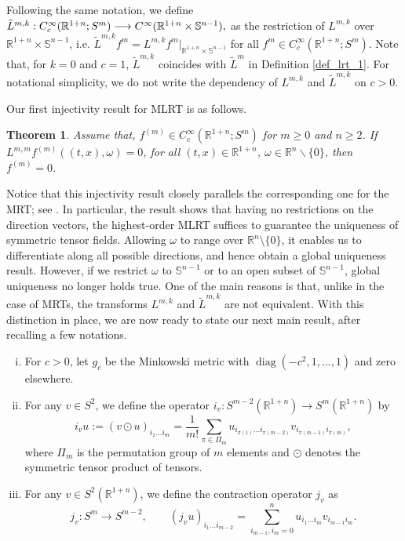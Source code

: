 \documentclass[11pt,a4paper,reqno]{amsart}
\newtheorem{theorem}{Theorem}
\DeclareMathOperator{\diag}{diag}
\newcommand{\Rn}{\mathbb{R}^n}
\newcommand{\R}{\mathbb{R}}
\newcommand{\om}{\omega}
\newcommand{\sn}{\mathbb{S}^{n-1}}
\newcommand{\Rno}{\mathbb{R}^{1+n}}
\begin{document}
Following the same notation, we define $\Tilde{L}^{m,k}: C_{c}^{\infty}(\mathbb{R}^{1+n};S^m) \longrightarrow C^{\infty}(\mathbb{R}^{1+n}\times\sn),$ as the restriction of $L^{m,k}$ over $\R^{1+n} \times \sn$, i.e. 
	 $\tilde{L}^{m,k}f^m= L^{m,k} f^{m}|_{\Rno\times \sn}$ for all $f^m \in   C_{c}^{\infty}(\mathbb{R}^{1+n};S^m)$.
	Note that, for $k=0$ and $c=1$, $\tilde{L}^{m,k}$ coincides with $\tilde{L}^{m}$ in Definition \ref{def_lrt_1}.
	For notational simplicity, we do not write the dependency of $L^{m,k}$ and $\tilde{L}^{m,k}$ on $c>0$.
    
Our first injectivity result for MLRT is as follows.
\begin{theorem}\label{thm:whole_inj_MLRT2} Assume that, $f^{(m)} \in C_{c}^{\infty}(\mathbb{R}^{1+n};S^{m})$ for $m\geq 0$ and $n\ge 2$. If $L^{m,m}f^{(m)}((t,x),\om)=0$, for all $(t,x)\in \R^{1+n}$, $\om \in \R^{n}\backslash \{0\}$, then $f^{(m)}=0$.
	\end{theorem}
	Notice that this injectivity result closely parallels the corresponding one for the MRT; see \cite{krishnan2018momentum}. In particular, the result shows that having no restrictions on the direction vectors, the highest-order MLRT suffices to guarantee the uniqueness of symmetric tensor fields. Allowing $\omega$ to range  over $\Rn \setminus \{0\}$, it enables us to differentiate  along all possible directions, and hence obtain a global uniqueness result. However, if we restrict $\omega$ to $\sn$ or to an open subset of $\sn$, global uniqueness no longer holds true. One of the main reasons is that, unlike in the case of MRTs, the transforms $L^{m,k}$ and $\tilde{L}^{m,k}$ are not equivalent.
	With this distinction in place, we are now ready to state our next main result, after recalling a few notations.
	 \begin{enumerate}[i)]
	 	\item For $c > 0$, let $g_c$ be the Minkowski metric with $\diag(-c^2, 1, \dots, 1)$ and zero elsewhere.
	 	\item For any $v \in S^2$, we define the operator $i_v : S^{m-2}(\R^{1+n}) \to S^m(\R^{1+n})$ by
	 	\begin{equation}
	 		i_v u := (v \odot u)_{i_1\dots i_{m}}
	 		=\frac{1}{m!}\sum_{\pi \in \Pi_{m}} u_{i_{\pi(1)}\dots i_{\pi(m-2)}}v_{i_{\pi(m-1)}i_{\pi(m)}},
	 	\end{equation}
        where $\Pi_m$ is the permutation group of $m$ elements and $\odot$ denotes the symmetric tensor product of tensors.
	 	\item For any $v \in S^2(\R^{1+n})$, we define the contraction operator $j_{v}$ as
	 	\[
	       j_{v}:S^m \to S^{m-2},\qquad 
	 	(j_{v}u)_{i_1\dots i_{m-2}}  = \sum_{i_{m-1},i_{m}=0}^{n}u_{i_1 \dots i_{m}}v_{i_{m-1}i_{m}}.
	 	\]
	 \end{enumerate}
\end{document}
